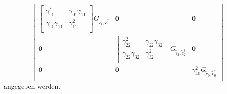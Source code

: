 \[
\begin{bmatrix}
    \begin{bmatrix}
        \gamma_{01}^2           & \gamma_{01}\gamma_{11}                \\
        \gamma_{01}\gamma_{11}  & \gamma_{11}^2                         \\
    \end{bmatrix} G_{\tilde{c}_1, \tilde{c}^\dagger_1}   &   \mathbf{0}  &   \mathbf{0}            \\
    \mathbf{0}      & \begin{bmatrix}
                        \gamma_{22}^2           & \gamma_{22}\gamma_{32}\\
                        \gamma_{22}\gamma_{32}  & \gamma_{32}^2         \\
                      \end{bmatrix} G_{\tilde{c}_2, \tilde{c}^\dagger_2}  &   \mathbf{0}          \\
    \mathbf{0}      &   \mathbf{0}  &   \gamma_{40}^2           G_{\tilde{c}_0, \tilde{c}^\dagger_0}       \\
\end{bmatrix}
\]
angegeben werden.
